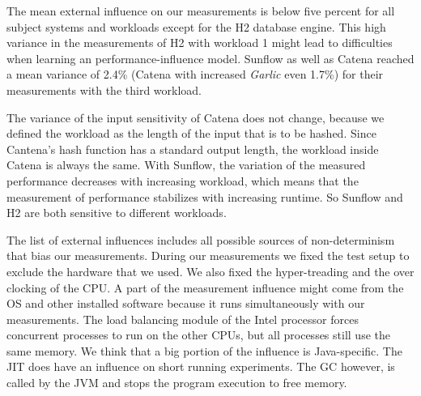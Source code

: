 


The mean external influence on our measurements is below five percent for all subject systems and workloads except for the H2 database engine. This high variance in the measurements of H2 with workload 1 might lead to difficulties when learning an performance-influence model. Sunflow as well as Catena reached a mean variance of 2.4\% (Catena with increased \textit{Garlic} even 1.7\%) for their measurements with the third workload.

The variance of the input sensitivity of Catena does not change, because we defined the workload as the length of the input that is to be hashed. Since Cantena's hash function has a standard output length, the workload inside Catena is always the same. With Sunflow, the variation of the measured performance decreases with increasing workload, which means that the measurement of performance stabilizes with increasing runtime. So Sunflow and H2 are both sensitive to different workloads.


The list of external influences includes all possible sources of non-determinism that bias our measurements. During our measurements we fixed the test setup to exclude the hardware that we used. We also fixed the hyper-treading and the over clocking of the CPU. A part of the measurement influence might come from the \ac{OS} and other installed software because it runs simultaneously with our measurements. The load balancing module of the Intel processor forces concurrent processes to run on the other CPUs, but all processes still use the same memory. 
We think that a big portion of the influence is Java-specific. The \ac{JIT} does have an influence on short running experiments. The \ac{GC} however, is called by the \ac{JVM} and stops the program execution to free memory. 




